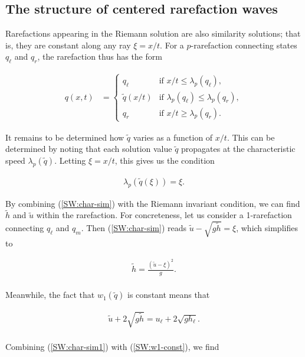 \documentclass{SIAMbook2016}
\begin{document}
\hypertarget{the-structure-of-centered-rarefaction-waves}{%
\subsection{The structure of centered rarefaction
waves}\label{the-structure-of-centered-rarefaction-waves}}

Rarefactions appearing in the Riemann solution are also similarity
solutions; that is, they are constant along any ray \(\xi=x/t\). For a
\(p\)-rarefaction connecting states \(q_\ell\) and \(q_r\), the
rarefaction thus has the form

\begin{align}
    q(x,t) & = \begin{cases} q_\ell & \text{if } x/t \le \lambda_p(q_\ell), \\
                            \tilde{q}(x/t) & \text{if } \lambda_p(q_\ell) \le \lambda_p(q_r), \\
                            q_r & \text{if } x/t \ge \lambda_p(q_r). \end{cases}
\end{align}

It remains to be determined how \(\tilde{q}\) varies as a function of
\(x/t\). This can be determined by noting that each solution value
\(\tilde{q}\) propagates at the characteristic speed
\(\lambda_p(\tilde{q})\). Letting \(\xi=x/t\), this gives us the
condition

\begin{align} \label{SW:char-sim}
    \lambda_p(\tilde{q}(\xi)) = \xi.
\end{align}

By combining (\ref{SW:char-sim}) with the Riemann invariant condition,
we can find \(\tilde{h}\) and \(\tilde{u}\) within the rarefaction. For
concreteness, let us consider a 1-rarefaction connecting \(q_\ell\) and
\(q_m\). Then (\ref{SW:char-sim}) reads
\(\tilde{u} - \sqrt{g\tilde{h}} = \xi\), which simplifies to

\begin{align} \label{SW:char-sim1}
\tilde{h} = \frac{(\tilde{u}-\xi)^2}{g}.
\end{align}\\
Meanwhile, the fact that \(w_1(\tilde{q})\) is constant means that

\begin{align} \label{SW:w1-const}
    \tilde{u} + 2 \sqrt{g\tilde{h}} = u_\ell + 2 \sqrt{gh_\ell}.
\end{align}\\
Combining (\ref{SW:char-sim1}) with (\ref{SW:w1-const}), we find
\end{document}
